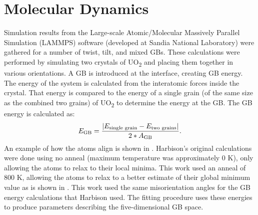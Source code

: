\documentclass[twoside,senior]{BYUPhys}
\begin{document}
\section{Molecular Dynamics\label{methods:MD}}
Simulation results from the Large-scale Atomic/Molecular Massively Parallel Simulation (LAMMPS) software (developed at Sandia National Laboratory\cite{plimpton1995}) were gathered for a number of twist, tilt, and mixed GBs.  These calculations were performed by simulating two crystals of UO\textsubscript{2} and placing them together in various orientations.  A GB is introduced at the interface, creating GB energy.  The energy of the system is calculated from the interatomic forces inside the crystal.  That energy is compared to the energy of a single grain (of the same size as the combined two grains) of UO\textsubscript{2} to determine the energy at the GB.\cite{harbison2015}  The GB energy is calculated as:\cite{butterfield2013}
\begin{equation}
E_{\textnormal{GB}}=\frac{|E_{\textnormal{single grain}} - E_{\textnormal{two grains}}|}{2*A_{\textnormal{GB}}}.
\end{equation} 
An example of how the atoms align is shown in . Harbison's original calculations\cite{harbison2015} were done using no anneal (maximum temperature was approximately 0 K), only allowing the atoms to relax to their local minima.  This work used an anneal of 800 K, allowing the atoms to relax to a better estimate of their global minimum value as is shown in .  This work used the same misorientation angles for the GB energy calculations that Harbison used.  The fitting procedure uses these energies to produce parameters describing the five-dimensional GB space.
\end{document}
